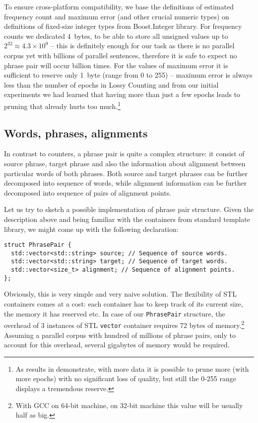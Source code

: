 To ensure cross-platform compatibility, we base the definitions of estimated frequency count and
maximum error (and other crucial numeric types) on definitions of fixed-size integer types from
Boost.Integer library.
For frequency counts we dedicated 4~bytes, to be able to store all unsigned values up to
$2^{32} \approx 4.3 \times 10^9$ -- this is definitely enough for our task as there is no
parallel corpus yet with billions of parallel sentences, therefore it is safe to expect no phrase
pair will occur billion times.
For the values of maximum error it is sufficient to reserve only 1~byte (range from 0 to 255)
-- maximum error is always less than the number of epochs in Lossy Counting and from our initial
experiments we had learned that having more than just a few epochs leads to pruning that already
hurts too much.\footnote{As results in  demonstrate, with more data it is
possible to prune more (with more epochs) with no significant loss of quality, but still the 0-255
range displays a tremendous reserve.}

\subsection{Words, phrases, alignments}


In contrast to counters, a phrase pair is quite a complex structure: it consist of source phrase,
target phrase and also the information about alignment between particular words of both phrases.
Both source and target phrases can be further decomposed into sequence of words, while alignment
information can be further decomposed into sequence of pairs of alignment points.

Let us try to sketch a possible implementation of phrase pair structure.
Given the description above and being familiar with the containers from standard
template library, we might come up with the following declaration:
\begin{verbatim}
struct PhrasePair {
  std::vector<std::string> source; // Sequence of source words.
  std::vector<std::string> target; // Sequence of target words.
  std::vector<size_t> alignment; // Sequence of alignment points.
};
\end{verbatim}

Obviously, this is very simple and very naive solution.
The flexibility of STL containers comes at a cost: each container has to keep track of its
current size, the memory it has reserved etc.
In case of our \verb|PhrasePair| structure, the overhead of 3 instances of STL \verb|vector|
container requires 72 bytes of memory.\footnote{With GCC on 64-bit machine, on 32-bit machine
this value will be usually half as big.}
Assuming a parallel corpus with hundred of millions of phrase pairs, only to account for
this overhead, several gigabytes of memory would be required.

